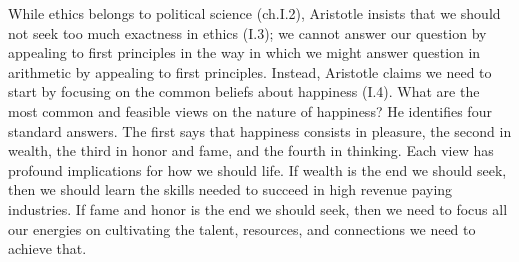 \documentclass[oneside]{article}
\begin{document}
While ethics belongs to political science (ch.I.2), Aristotle insists that we should not seek too much exactness in ethics (I.3); we cannot answer our question by appealing to first principles in the way in which we might answer question in arithmetic by appealing to first principles. Instead, Aristotle claims we need to start by focusing on the common beliefs about happiness (I.4). What are the most common and feasible views on the nature of happiness? He identifies four standard answers. The first says that happiness consists in pleasure, the second in wealth, the third in honor and fame, and the fourth in thinking. Each view has profound implications for how we should life. If wealth is the end we should seek, then we should learn the skills needed to succeed in high revenue paying industries. If fame and honor is the end we should seek, then we need to focus all our energies on cultivating the talent, resources, and connections we need to achieve that. 










\end{document}
